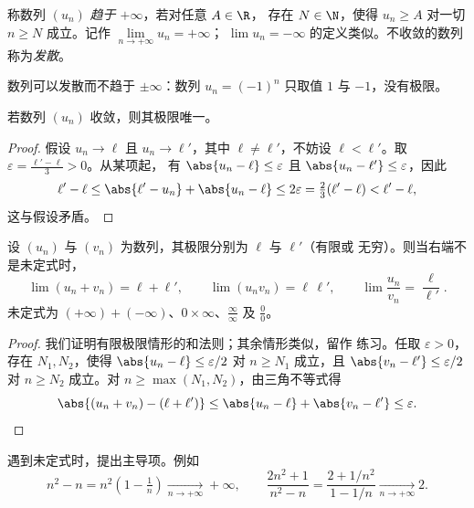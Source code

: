 \begin{definition}[发散到无穷]\label{def:g12:seq:infinity}
称数列 $(u_n)$ \emph{趋于 $+\infty$}，若对任意 $A \in \R$，
存在 $N \in \N$，使得 $u_n \geq A$ 对一切 $n \geq N$ 成立。记作
$\lim\limits_{n\to+\infty} u_n = +\infty$；
$\lim u_n = -\infty$ 的定义类似。不收敛的数列
称为\emph{发散}。
\end{definition}

\begin{remark}
数列可以发散而不趋于 $\pm\infty$：数列
$u_n = (-1)^n$ 只取值 $1$ 与 $-1$，没有极限。
\end{remark}

\begin{proposition}[极限的唯一性]\label{prop:g12:seq:uniqueness}
若数列 $(u_n)$ 收敛，则其极限唯一。
\end{proposition}

\begin{proof}
假设 $u_n \to \ell$ 且 $u_n \to \ell'$，其中 $\ell \neq \ell'$，不妨设
$\ell < \ell'$。取 $\varepsilon = \frac{\ell' - \ell}{3} > 0$。从某项起，
有 $\abs{u_n - \ell} \leq \varepsilon$ 且
$\abs{u_n - \ell'} \leq \varepsilon$，因此
\[
\ell' - \ell \leq \abs{\ell' - u_n} + \abs{u_n - \ell}
\leq 2\varepsilon = \tfrac{2}{3}(\ell' - \ell) < \ell' - \ell,
\]
这与假设矛盾。
\end{proof}

\begin{proposition}[极限的运算]\label{prop:g12:seq:operations}
设 $(u_n)$ 与 $(v_n)$ 为数列，其极限分别为 $\ell$ 与 $\ell'$（有限或
无穷）。则当右端不是未定式时，
\[
\lim (u_n + v_n) = \ell + \ell', \qquad
\lim (u_n v_n) = \ell\,\ell', \qquad
\lim \frac{u_n}{v_n} = \frac{\ell}{\ell'}.
\]
未定式为
$(+\infty) + (-\infty)$、$0 \times \infty$、$\frac{\infty}{\infty}$ 及
$\frac{0}{0}$。
\end{proposition}

\begin{proof}
我们证明有限极限情形的和法则；其余情形类似，留作
练习。任取 $\varepsilon > 0$，存在 $N_1, N_2$，使得
$\abs{u_n - \ell} \leq \varepsilon/2$ 对 $n \geq N_1$ 成立，且
$\abs{v_n - \ell'} \leq \varepsilon/2$ 对 $n \geq N_2$ 成立。对
$n \geq \max(N_1, N_2)$，由三角不等式得
\[
\abs{(u_n + v_n) - (\ell + \ell')}
\leq \abs{u_n - \ell} + \abs{v_n - \ell'} \leq \varepsilon. \qedhere
\]
\end{proof}

\begin{method}[提取主导项处理未定式]\label{met:g12:seq:indeterminate}
遇到未定式时，提出主导项。例如
\[
n^2 - n = n^2\left(1 - \tfrac{1}{n}\right) \xrightarrow[n\to+\infty]{} +\infty,
\qquad
\frac{2n^2+1}{n^2 - n} = \frac{2 + 1/n^2}{1 - 1/n}
\xrightarrow[n\to+\infty]{} 2 .
\]
\end{method}


